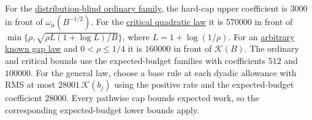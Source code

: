 For the \href{https://github.com/davidiach/adaptive-threshold-estimation/blob/d797ef633423516ce9e8e74cce3991b8aae82e73/lean/ThresholdHC/HardBudget/Ordinary.lean}{distribution-blind ordinary family},
the hard-cap upper coefficient is $3000$ in front of $\omega_\mu(B^{-1/2})$.
For the \href{https://github.com/davidiach/adaptive-threshold-estimation/blob/720fc2bda6b24b62a8fbd086d586f1714e03b902/lean/ThresholdHC/HardBudget/Critical.lean}{critical quadratic law}
it is $570000$ in front of
$\min\{\rho,\sqrt{\rho L(1+\log L)/B}\}$, where $L=1+\log(1/\rho)$.
For an \href{https://github.com/davidiach/adaptive-threshold-estimation/blob/720fc2bda6b24b62a8fbd086d586f1714e03b902/lean/ThresholdHC/HardBudget/Rare.lean}{arbitrary known gap law} and $0<\rho\le1/4$ it is $160000$ in
front of $\mathcal K(B)$. The ordinary and critical bounds use the
expected-budget families with coefficients $512$ and $100000$.
For the general law, choose a base rule at each dyadic allowance with
RMS at most $28001\,\mathcal K(b_j)$ using the positive rate and the
expected-budget coefficient $28000$. Every pathwise cap bounds expected
work, so the corresponding expected-budget lower bounds apply.
